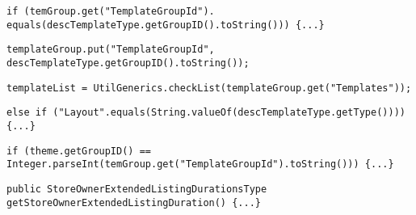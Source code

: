 \begin{lstlisting}[firstnumber=245, caption={Line 245 acceptable violation of the rule}]
if (temGroup.get("TemplateGroupId"). equals(descTemplateType.getGroupID().toString())) {...}
\end{lstlisting}
\noindent\makebox[\linewidth]{\rule{\linewidth}{0.4pt}}
\begin{lstlisting}[firstnumber=253, caption={Line 253 acceptable violation of the rule}]
templateGroup.put("TemplateGroupId", descTemplateType.getGroupID().toString());
\end{lstlisting}
\noindent\makebox[\linewidth]{\rule{\linewidth}{0.4pt}}
\begin{lstlisting}[firstnumber=259, caption={Line 259 acceptable violation of the rule}]
templateList = UtilGenerics.checkList(templateGroup.get("Templates"));
\end{lstlisting}
\noindent\makebox[\linewidth]{\rule{\linewidth}{0.4pt}}
\begin{lstlisting}[firstnumber=263, caption={Line 263 acceptable violation of the rule}]
else if ("Layout".equals(String.valueOf(descTemplateType.getType()))) {...}
\end{lstlisting}
\noindent\makebox[\linewidth]{\rule{\linewidth}{0.4pt}}
\begin{lstlisting}[firstnumber=270, caption={Line 270 acceptable violation of the rule}]
if (theme.getGroupID() == Integer.parseInt(temGroup.get("TemplateGroupId").toString())) {...}
\end{lstlisting}
\noindent\makebox[\linewidth]{\rule{\linewidth}{0.4pt}}
\begin{lstlisting}[firstnumber=334, caption={Line 334 acceptable violation of the rule}]
public StoreOwnerExtendedListingDurationsType getStoreOwnerExtendedListingDuration() {...}
\end{lstlisting}
\noindent\makebox[\linewidth]{\rule{\linewidth}{0.4pt}}

